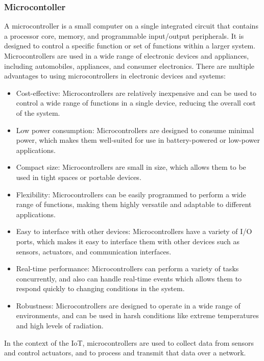 \subsubsection{Microcontoller}
A microcontroller is a small computer on a single integrated circuit that contains a processor core, memory, and programmable input/output peripherals. It is designed to control a specific function or set of functions within a larger system. Microcontrollers are used in a wide range of electronic devices and appliances, including automobiles, appliances, and consumer electronics.
There are multiple advantages to using microcontrollers in electronic devices and systems:
\begin{itemize}
\item Cost-effective: Microcontrollers are relatively inexpensive and can be used to control a wide range of functions in a single device, reducing the overall cost of the system.
\item Low power consumption: Microcontrollers are designed to consume minimal power, which makes them well-suited for use in battery-powered or low-power applications.
\item Compact size: Microcontrollers are small in size, which allows them to be used in tight spaces or portable devices.
\item Flexibility: Microcontrollers can be easily programmed to perform a wide range of functions, making them highly versatile and adaptable to different applications.
\item Easy to interface with other devices: Microcontrollers have a variety of \ac{I/O} ports, which makes it easy to interface them with other devices such as sensors, actuators, and communication interfaces.
\item Real-time performance: Microcontrollers can perform a variety of tasks concurrently, and also can handle real-time events which allows them to respond quickly to changing conditions in the system.
\item Robustness: Microcontrollers are designed to operate in a wide range of environments, and can be used in harsh conditions like extreme temperatures and high levels of radiation.
\end{itemize}
In the context of the \ac{IoT}, microcontrollers are used to collect data from sensors and control actuators, and to process and transmit that data over a network.
